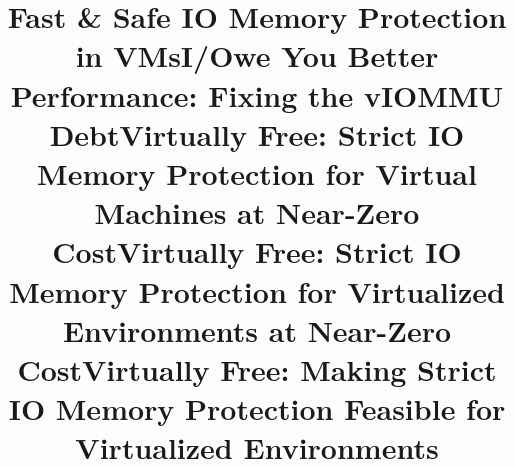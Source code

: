 \documentclass[sigplan,10pt]{acmart}
\begin{document}
\title{Fast \& Safe IO Memory Protection in VMs}
\title{I/Owe You Better Performance: Fixing the vIOMMU Debt}
\title{Virtually Free: Strict IO Memory Protection for Virtual Machines at Near-Zero Cost}
\title{Virtually Free: Strict IO Memory Protection for Virtualized Environments at Near-Zero Cost}
\title{Virtually Free: Making Strict IO Memory Protection Feasible for Virtualized Environments}


\newcommand{\name}{vFree}


\newcommand{\brand}{vFree }
\newcommand{\optOne}{one-for-many invalidation}
\newcommand{\optOneHeading}{One-for-many Invalidation}



\maketitle
\pagestyle{plain}


% 
% 


% 
% 

% 


% 






\clearpage 
\renewcommand{\balance}{}
\appendix

\end{document}
